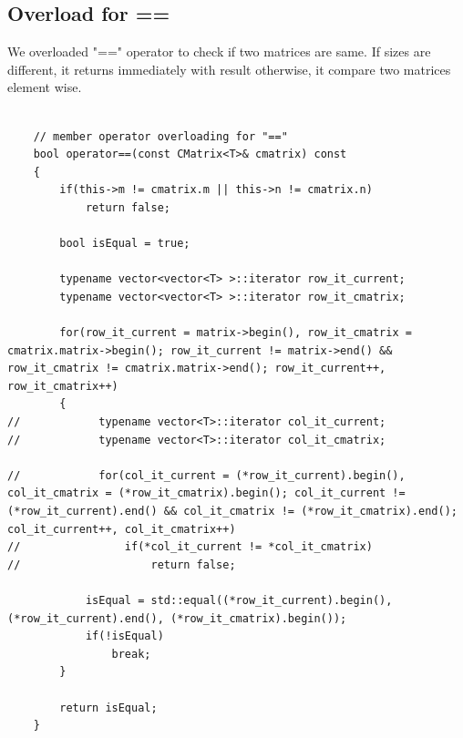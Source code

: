 \documentclass{article}
\begin{document}
	\subsection{Overload for ==}
	We overloaded "==" operator to check if two matrices are same. If sizes are different, it returns immediately with result otherwise, it compare two matrices element wise.
	
	\begin{lstlisting}[label=CMatrixEqual, caption=CMatrix Equal Check]
	
    // member operator overloading for "=="
    bool operator==(const CMatrix<T>& cmatrix) const
    {
        if(this->m != cmatrix.m || this->n != cmatrix.n)
            return false;

        bool isEqual = true;

        typename vector<vector<T> >::iterator row_it_current;
        typename vector<vector<T> >::iterator row_it_cmatrix;

        for(row_it_current = matrix->begin(), row_it_cmatrix = cmatrix.matrix->begin(); row_it_current != matrix->end() && row_it_cmatrix != cmatrix.matrix->end(); row_it_current++, row_it_cmatrix++)
        {
//            typename vector<T>::iterator col_it_current;
//            typename vector<T>::iterator col_it_cmatrix;

//            for(col_it_current = (*row_it_current).begin(), col_it_cmatrix = (*row_it_cmatrix).begin(); col_it_current != (*row_it_current).end() && col_it_cmatrix != (*row_it_cmatrix).end(); col_it_current++, col_it_cmatrix++)
//                if(*col_it_current != *col_it_cmatrix)
//                    return false;

            isEqual = std::equal((*row_it_current).begin(), (*row_it_current).end(), (*row_it_cmatrix).begin());
            if(!isEqual)
                break;
        }

        return isEqual;
    }
	\end{lstlisting}
	
\end{document}
